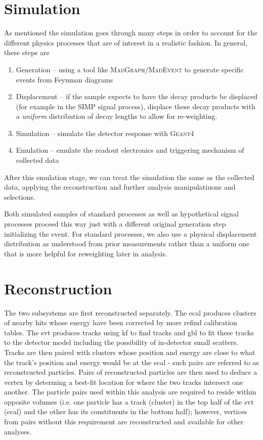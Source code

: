 \section{Simulation} \label{sec:hps:sim}
As mentioned the simulation goes through many steps in order to account for the different physics
processes that are of interest in a realistic fashion. In general, these steps are
\begin{enumerate}
  \item Generation -- using a tool like \textsc{MadGraph/MadEvent}\cite{madgraph4-2007,madgraph5-2014}
        to generate specific events from Feynman diagrams
  \item Displacement -- if the sample expects to have the decay products be displaced (for example in the
        SIMP signal process), displace these decay products with a \emph{uniform} distribution of decay
        lengths to allow for re-weighting.
  \item Simulation -- simulate the detector response with \textsc{Geant4}\cite{geant4}
  \item Emulation -- emulate the readout electronics and triggering mechanism of collected data
\end{enumerate}
After this emulation stage, we can treat the simulation the same as the collected data,
applying the reconstruction and further analysis manipulatiuons and selections.

Both simulated samples of standard processes as well as hypothetical signal processes proceed this way
just with a different original generation step initializing the event. For standard processes, we also
use a physical displacement distribution as understood from prior measurements rather than a uniform
one that is more helpful for reweighting later in analysis.

\section{Reconstruction}

The two subsystems are first reconstructed separately.
The \ac{ecal} produces clusters of nearby hits whose energy
have been corrected by more refind calibration tables.
The \ac{svt} produces tracks using \ac{kf} to find tracks
and \ac{gbl} to fit these tracks to the detector model including
the possibility of in-detector small scatters.
Tracks are then paired with clusters whose position and energy
are close to what the track's position and energy would be at
the \ac{ecal} - such pairs are referred to as reconstructed
particles.
Pairs of reconstructed particles are then used to deduce a
vertex by determing a best-fit location for where the two tracks
intersect one another.
The particle pairs used within this analysis are required to reside
within opposite volumes (i.e. one particle has a track (cluster)
in the top half of the \ac{svt} (\ac{ecal}) and the other has its
constituents in the bottom half); however, vertices from pairs
without this requirement are reconstructed and available for
other analyses.

